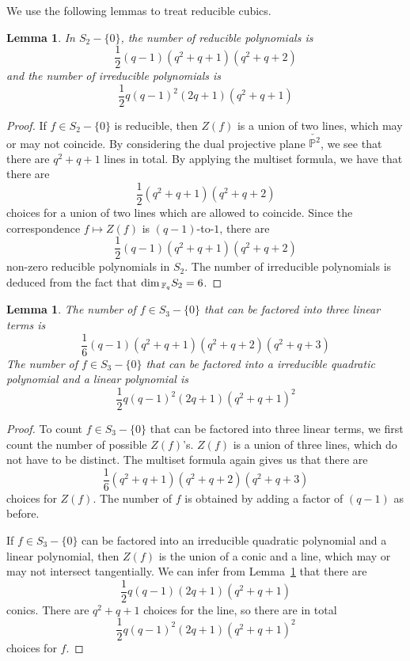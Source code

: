 \documentclass[12pt]{article}
\theoremstyle{plain}
\newtheorem{lemma}[equation]{Lemma}
\theoremstyle{definition}
\newcommand{\IF}{\mathbb{F}}
\newcommand{\IP}{\mathbb{P}}
\renewcommand\dim{{\rm dim\,}}
\newcommand{\<}{\langle}
\renewcommand{\>}{\rangle}
\begin{document}
We use the following lemmas to treat reducible cubics. 
\begin{lemma}
\label{countquadratic}
In $S_2 - \{0\}$, the number of reducible polynomials is
$$ \frac{1}{2}(q - 1)(q^2 + q + 1)(q^2 + q + 2) $$
and the number of irreducible polynomials is 
$$ \frac{1}{2} q(q - 1)^2 (2q + 1) (q^2 + q + 1) $$
\end{lemma}
\begin{proof}
If $f \in S_2 - \{0\}$ is reducible, then $Z(f)$ is a union of two lines, which may or may not coincide. By considering the dual projective plane $\check{\IP^2}$, we see that there are $q^2 + q + 1$ lines in total. By applying the multiset formula, we have that there are 
$$ \frac{1}{2}(q^2 + q + 1)(q^2 + q + 2)  $$
choices for a union of two lines which are allowed to coincide. 
Since the correspondence $f \mapsto Z(f)$ is $(q - 1)$-to-$1$, there are
$$ \frac{1}{2}(q - 1)(q^2 + q + 1)(q^2 + q + 2) $$
non-zero reducible polynomials in $S_2$. The number of irreducible polynomials is deduced from the fact that $\dim_{\IF_q} S_2 = 6$. 
\end{proof}

\begin{lemma}
The number of $f \in S_3 - \{0\}$ that can be factored into three linear terms is 
$$ \frac{1}{6} (q - 1) (q^2 + q + 1) (q^2 + q + 2) (q^2 + q + 3)$$ 
The number of $f \in S_3 - \{0\}$ that can be factored into a irreducible quadratic polynomial and a linear polynomial is 
$$  \frac{1}{2} q(q - 1)^2(2q + 1) (q^2 + q + 1)^2 $$
\end{lemma}
\begin{proof}
To count $f \in S_3 - \{0\}$ that can be factored into three linear terms, we first count the number of possible $Z(f)$'s. $Z(f)$ is a union of three lines, which do not have to be distinct. The multiset formula again gives us that there are 
$$ \frac{1}{6} (q^2 + q + 1) (q^2 + q + 2) (q^2 + q + 3) $$
choices for $Z(f)$. The number of $f$ is obtained by adding a factor of $(q - 1)$ as before.

If $f \in S_3 - \{0\}$ can be factored into an irreducible quadratic polynomial and a linear polynomial, then $Z(f)$ is the union of a conic and a line, which may or may not intersect tangentially. We can infer from Lemma~\ref{countquadratic} that there are 
$$ \frac{1}{2} q(q - 1)(2q + 1) (q^2 + q + 1) $$
conics. There are $q^2 + q  + 1$ choices for the line, so there are in total
$$  \frac{1}{2} q(q - 1)^2(2q + 1) (q^2 + q + 1)^2 $$
choices for $f$. 
\end{proof}
\end{document}
